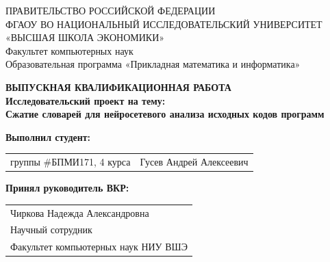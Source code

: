 \begin{titlepage}
\newpage

{
\begin{center}
ПРАВИТЕЛЬСТВО РОССИЙСКОЙ ФЕДЕРАЦИИ\\
ФГАОУ ВО НАЦИОНАЛЬНЫЙ ИССЛЕДОВАТЕЛЬСКИЙ УНИВЕРСИТЕТ\\
«ВЫСШАЯ ШКОЛА ЭКОНОМИКИ»
\\
\bigskip
Факультет компьютерных наук\\
Образовательная программа «Прикладная математика и информатика»
\end{center}
}

\vspace{7em}

\begin{center}
{\bf ВЫПУСКНАЯ КВАЛИФИКАЦИОННАЯ РАБОТА}\\
{\bf Исследовательский проект на тему:}\\
{\bf Сжатие словарей для нейросетевого анализа исходных кодов программ}\\
\end{center}

\vspace{2em}

{\bf Выполнил студент: \vspace{2mm}}

{
\begin{tabular}{l@{\hskip 1.5cm}l}
группы \#БПМИ171, 4 курса & Гусев Андрей Алексеевич 
\end{tabular}}


\vspace{1em}
{\bf Принял руководитель ВКР: \vspace{2mm}}

{
\begin{tabular}{l}
Чиркова Надежда Александровна\\
Научный сотрудник\\
Факультет компьютерных наук НИУ ВШЭ 
\end{tabular}}



\end{titlepage}

